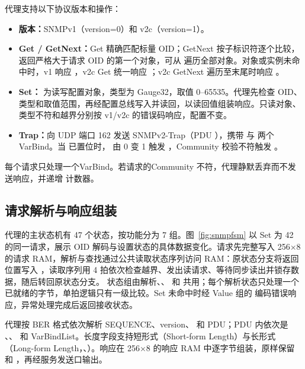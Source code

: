 代理支持以下协议版本和操作：
\begin{itemize}
  \item \textbf{版本：}SNMPv1（version=0）和 v2c（version=1）。
  \item \textbf{Get / GetNext：}Get 精确匹配标量 OID；GetNext 按子标识符逐个比较，返回严格大于请求 OID 的第一个对象，可从  遍历全部对象。对象或实例未命中时，v1 响应 ，v2c Get 统一响应 ；v2c GetNext 遍历至末尾时响应 。
  \item \textbf{Set：} 为读写配置对象，类型为 Gauge32，取值 0--65535。代理先检查 OID、类型和取值范围，再经配置总线写入并读回，以读回值组装响应。只读对象、类型不符和越界分别按 v1/v2c 的错误码响应，配置不变。
  \item \textbf{Trap：}向 UDP 端口 162 发送 SNMPv2-Trap（PDU ），携带  与  两个 VarBind。当  已置位时， 由 0 变 1 触发 ，Community 校验不符触发 。
\end{itemize}
每个请求只处理一个VarBind。若请求的Community 不符，代理静默丢弃而不发送响应，并递增  计数器。

\subsection{请求解析与响应组装}

代理的主状态机有 47 个状态，按功能分为 7 组。图~\ref{fig:snmpfsm} 以 Set  为 42 的同一请求，展示 OID 解码与设置状态的具体数据变化。请求先完整写入 256$\times$8 的请求 RAM，解析与查找通过公共读取状态序列访问 RAM：原状态分支将返回位置写入 ，读取序列用 4 拍依次检查越界、发出读请求、等待同步读出并锁存数据，随后转回原状态分支。 状态组由解析、、 和  共用；每个解析状态只处理一个已就绪的字节，单拍逻辑只有一级比较。Set 未命中时经 Value 组的  编码错误响应，异常处理完成后返回接收状态。


代理按 BER 格式依次解析 SEQUENCE、version、 和 PDU；PDU 内依次是 、、 和 VarBindList。长度字段支持短形式（Short-form Length）与长形式（Long-form Length，、）。响应在 256$\times$8 的响应 RAM 中逐字节组装，原样保留  和 ，再经服务发送口输出。

